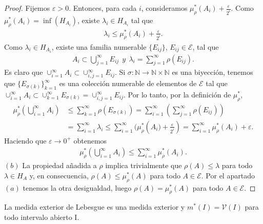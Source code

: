 \begin{proof}
    Fijemos $\varepsilon > 0$. Entonces, para cada $i$, consideramos $\mu_{\rho}^*(A_i) + \frac{\varepsilon}{2^i}$. Como $\mu_{\rho}^*(A_i) = \inf(H_{A_i})$, existe $\lambda_i \in H_{A_i}$ tal que
    \begin{align*}
        \lambda_i \leq \mu_{\rho}^*(A_i) + \frac{\varepsilon}{2^i}.
    \end{align*}
    Como $\lambda_i \in H_{A_i}$, existe una familia numerable $\{E_{ij}\}$, $E_{ij} \in \mathcal{E}$, tal que
    \begin{align*}
        A_i \subset \bigcup_{j=1}^{\infty}{E_{ij}} \ \ y \ \ \lambda_i = \sum_{j=1}^{\infty}{\rho(E_{ij})}.
    \end{align*}
    Es claro que $\cup_{i=1}^{\infty}{A_i} \subset \cup_{i,j=1}^{\infty}{E_{ij}}$. Si $\sigma: \mathbb{N} \longrightarrow \mathbb{N} \times \mathbb{N}$ es una biyección, tenemos que $\{E_{\sigma(k)}\}_{k=1}^{\infty}$ es una colección numerable de elementos de $\mathcal{E}$ tal que $\cup_{i=1}^{\infty}{A_i} \subset \cup_{k=1}^{\infty}{E_{\sigma(k)}} = \cup_{i,j=1}^{\infty}{E_{ij}}$. Por lo tanto, por la definición de $\mu_{\rho}^*$,
    \begin{align*}
        \mu_{\rho}^*\left( \bigcup_{i=1}^{\infty}{A_i}\right) & \leq \sum_{k=1}^{\infty}{\rho(E_{\sigma(k)})} = \sum_{i=1}^{\infty}{\left( \sum_{j=1}^{\infty}{\rho(E_{ij})}\right)}                                                        \\
                                                              & = \sum_{i=1}^{\infty}{\lambda_i} \leq \sum_{i=1}^{\infty}{(\mu_{\rho}^*\left(A_i) + \frac{\varepsilon}{2^i}\right)} = \sum_{i=1}^{\infty}{\mu_{\rho}^*(A_i) + \varepsilon}.
    \end{align*}
    Haciendo que $\varepsilon \to 0^+$ obtenemos
    \begin{align*}
        \mu_{\rho}^*\left( \bigcup_{i=1}^{\infty}{A_i}\right) \leq \sum_{i=1}^{\infty}{\mu_{\rho}^*(A_i)}.
    \end{align*}
    $(b)$ La propiedad añadida a $\rho$ implica trivialmente que $\rho(A) \leq \lambda$ para todo $\lambda \in H_A$ y, en consecuencia, $\rho(A) \leq \mu_{\rho}^*(A)$ para todo $A \in \mathcal{E}$. Por el apartado $(a)$ tenemos la otra desigualdad, luego $\rho(A) = \mu_{\rho}^*(A)$ para todo $A \in \mathcal{E}$.
\end{proof}

\begin{cor}
    La medida exterior de Lebesgue es una medida exterior y $m^*(I) = \mathcal{V}(I)$ para todo intervalo abierto I.
\end{cor}

